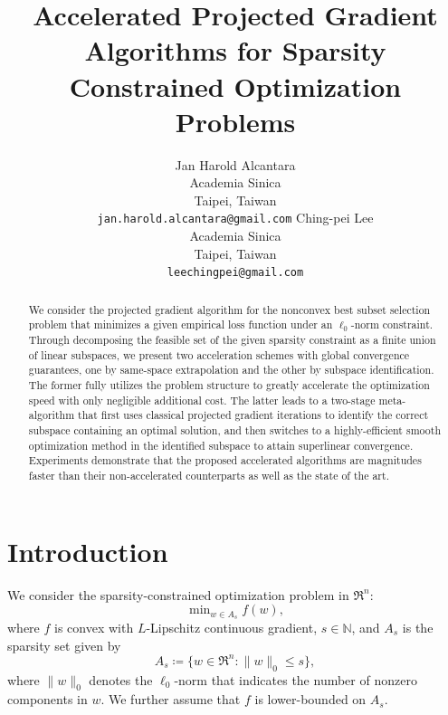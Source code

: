 \documentclass{article}
\title{Accelerated Projected Gradient Algorithms for Sparsity Constrained
Optimization Problems}
\author{%
  Jan Harold Alcantara\\
  Academia Sinica\\
  Taipei, Taiwan\\
  \texttt{jan.harold.alcantara@gmail.com}
  \And
  Ching-pei Lee\\
  Academia Sinica\\
  Taipei, Taiwan\\
  \texttt{leechingpei@gmail.com}
}
\theoremstyle{plain}
\theoremstyle{definition}
\theoremstyle{remark}
\newcommand{\N}{\mathbb{N}}
\begin{document}


\maketitle

\begin{abstract}
We consider the projected gradient algorithm for the nonconvex best subset selection
problem that minimizes a given empirical loss function under an $\ell_0$-norm
constraint.
Through decomposing the feasible set of the given sparsity constraint
as a finite union of linear subspaces, we present two acceleration
schemes with global convergence guarantees, one by same-space
extrapolation and the other by subspace identification.
The former fully utilizes the problem structure to greatly accelerate
the optimization speed with only negligible additional cost.
The latter leads to a two-stage meta-algorithm that first uses
classical projected gradient iterations to identify the correct
subspace containing an optimal solution, and then switches to
a highly-efficient smooth optimization method in the identified
subspace to attain superlinear convergence.
Experiments demonstrate that the proposed accelerated algorithms are
magnitudes faster than their non-accelerated counterparts as well as
the state of the art.
\end{abstract}

\section{Introduction}
We consider the sparsity-constrained optimization problem in $\Re^n$:
	\begin{equation}
	\label{eq:problem}
	\min\nolimits _{w \in A_s} f(w),
	\end{equation}
where $f$ is convex with $L$-Lipschitz continuous gradient, 
$s \in \N$,
and $A_s$ is the sparsity set given by
	\begin{equation}
		A_s \coloneqq \{ w \in \Re^n : \|w\|_0 \leq s\}, 
		\label{eq:As}
	\end{equation}
where $\|w\|_0$ denotes the $\ell_0$-norm that indicates the number of 
nonzero components in $w$. 
We further assume that $f$ is lower-bounded on $A_s$.
\end{document}
